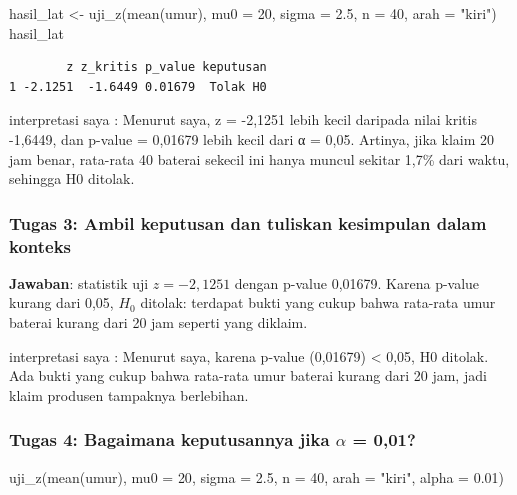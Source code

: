 \documentclass[
  indonesian,
  letterpaper,
]{book}
\newenvironment{Shaded}{\begin{snugshade}}{\end{snugshade}}
\newcommand{\AttributeTok}[1]{\textcolor[rgb]{0.40,0.45,0.13}{#1}}
\newcommand{\DecValTok}[1]{\textcolor[rgb]{0.68,0.00,0.00}{#1}}
\newcommand{\FloatTok}[1]{\textcolor[rgb]{0.68,0.00,0.00}{#1}}
\newcommand{\FunctionTok}[1]{\textcolor[rgb]{0.28,0.35,0.67}{#1}}
\newcommand{\NormalTok}[1]{\textcolor[rgb]{0.00,0.23,0.31}{#1}}
\newcommand{\OtherTok}[1]{\textcolor[rgb]{0.00,0.23,0.31}{#1}}
\newcommand{\StringTok}[1]{\textcolor[rgb]{0.13,0.47,0.30}{#1}}
\begin{document}
\begin{Shaded}
\begin{Highlighting}[]
\NormalTok{hasil\_lat }\OtherTok{\textless{}{-}} \FunctionTok{uji\_z}\NormalTok{(}\FunctionTok{mean}\NormalTok{(umur), }\AttributeTok{mu0 =} \DecValTok{20}\NormalTok{, }\AttributeTok{sigma =} \FloatTok{2.5}\NormalTok{, }\AttributeTok{n =} \DecValTok{40}\NormalTok{, }\AttributeTok{arah =} \StringTok{"kiri"}\NormalTok{)}
\NormalTok{hasil\_lat}
\end{Highlighting}
\end{Shaded}

\begin{verbatim}
        z z_kritis p_value keputusan
1 -2.1251  -1.6449 0.01679  Tolak H0
\end{verbatim}

interpretasi saya : Menurut saya, z = -2,1251 lebih kecil daripada nilai
kritis -1,6449, dan p-value = 0,01679 lebih kecil dari α = 0,05.
Artinya, jika klaim 20 jam benar, rata-rata 40 baterai sekecil ini hanya
muncul sekitar 1,7\% dari waktu, sehingga H0 ditolak.

\subsubsection{Tugas 3: Ambil keputusan dan tuliskan kesimpulan dalam
konteks}\label{tugas-3-ambil-keputusan-dan-tuliskan-kesimpulan-dalam-konteks}

\textbf{Jawaban}: statistik uji \(z = -2{,}1251\) dengan p-value
0,01679. Karena p-value kurang dari 0,05, \(H_0\) ditolak: terdapat
bukti yang cukup bahwa rata-rata umur baterai kurang dari 20 jam seperti
yang diklaim.

interpretasi saya : Menurut saya, karena p-value (0,01679) \textless{}
0,05, H0 ditolak. Ada bukti yang cukup bahwa rata-rata umur baterai
kurang dari 20 jam, jadi klaim produsen tampaknya berlebihan.

\subsubsection{\texorpdfstring{Tugas 4: Bagaimana keputusannya jika
\(\alpha\) =
0,01?}{Tugas 4: Bagaimana keputusannya jika \textbackslash alpha = 0,01?}}\label{tugas-4-bagaimana-keputusannya-jika-alpha-001}

\begin{Shaded}
\begin{Highlighting}[]
\FunctionTok{uji\_z}\NormalTok{(}\FunctionTok{mean}\NormalTok{(umur), }\AttributeTok{mu0 =} \DecValTok{20}\NormalTok{, }\AttributeTok{sigma =} \FloatTok{2.5}\NormalTok{, }\AttributeTok{n =} \DecValTok{40}\NormalTok{, }\AttributeTok{arah =} \StringTok{"kiri"}\NormalTok{, }\AttributeTok{alpha =} \FloatTok{0.01}\NormalTok{)}
\end{Highlighting}
\end{Shaded}
\end{document}
